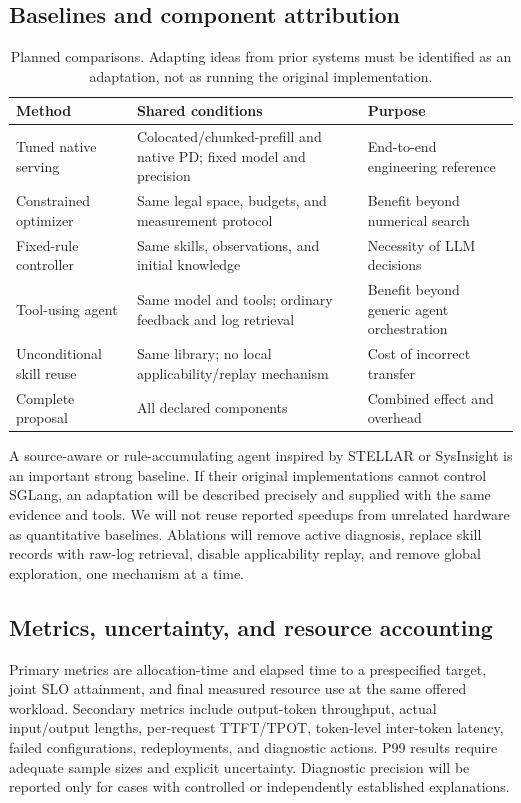 \documentclass[11pt,a4paper]{article}
\begin{document}
\subsection{Baselines and component attribution}
\begin{table}[t]
\centering\small
\begin{tabularx}{\linewidth}{@{}>{\raggedright\arraybackslash}p{36mm}YY@{}}
\toprule
Method & Shared conditions & Purpose \\
\midrule
Tuned native serving & Colocated/chunked-prefill and native PD; fixed model and precision & End-to-end engineering reference \\
Constrained optimizer & Same legal space, budgets, and measurement protocol & Benefit beyond numerical search \\
Fixed-rule controller & Same skills, observations, and initial knowledge & Necessity of LLM decisions \\
Tool-using agent & Same model and tools; ordinary feedback and log retrieval & Benefit beyond generic agent orchestration \\
Unconditional skill reuse & Same library; no local applicability/replay mechanism & Cost of incorrect transfer \\
Complete proposal & All declared components & Combined effect and overhead \\
\bottomrule
\end{tabularx}
\caption{Planned comparisons. Adapting ideas from prior systems must be identified as an adaptation, not as running the original implementation.}
\end{table}

A source-aware or rule-accumulating agent inspired by STELLAR or SysInsight is an important strong baseline. If their original implementations cannot control SGLang, an adaptation will be described precisely and supplied with the same evidence and tools. We will not reuse reported speedups from unrelated hardware as quantitative baselines. Ablations will remove active diagnosis, replace skill records with raw-log retrieval, disable applicability replay, and remove global exploration, one mechanism at a time.

\subsection{Metrics, uncertainty, and resource accounting}
Primary metrics are allocation-time and elapsed time to a prespecified target, joint SLO attainment, and final measured resource use at the same offered workload. Secondary metrics include output-token throughput, actual input/output lengths, per-request TTFT/TPOT, token-level inter-token latency, failed configurations, redeployments, and diagnostic actions. P99 results require adequate sample sizes and explicit uncertainty. Diagnostic precision will be reported only for cases with controlled or independently established explanations.
\end{document}
